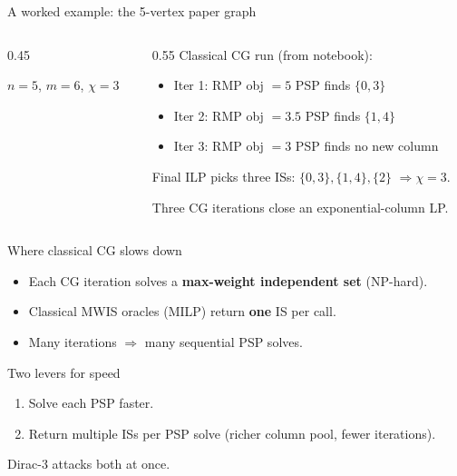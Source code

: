 \documentclass[aspectratio=169,11pt]{beamer}
\begin{document}
\begin{frame}{A worked example: the 5-vertex paper graph}
  \begin{columns}[T]
    \begin{column}{0.45\textwidth}
      \centering
      \medskip

      \footnotesize $n=5$, $m=6$, $\chi=3$
    \end{column}
    \begin{column}{0.55\textwidth}
      Classical CG run (from notebook):
      \begin{itemize}\footnotesize
        \item Iter 1: RMP obj $= 5$ \quad PSP finds $\{0,3\}$
        \item Iter 2: RMP obj $= 3.5$ \quad PSP finds $\{1,4\}$
        \item Iter 3: RMP obj $= 3$ \quad PSP finds no new column
      \end{itemize}
      \medskip

      Final ILP picks three ISs:
      $\{0,3\}, \{1,4\}, \{2\}$ \quad $\Rightarrow \chi = 3$.

      \medskip
      \footnotesize
      Three CG iterations close an exponential-column LP.
    \end{column}
  \end{columns}
\end{frame}

\begin{frame}{Where classical CG slows down}
  \begin{itemize}
    \item Each CG iteration solves a \textbf{max-weight independent set}
          (NP-hard).
    \item Classical MWIS oracles (MILP) return \textbf{one} IS per call.
    \item Many iterations $\Rightarrow$ many sequential PSP solves.
  \end{itemize}

  \medskip
  \begin{block}{Two levers for speed}
    \begin{enumerate}
      \item Solve each PSP faster.
      \item \alert{Return multiple ISs per PSP solve} (richer column pool, fewer iterations).
    \end{enumerate}
  \end{block}

  \medskip
  Dirac-3 attacks both at once.
\end{frame}
\end{document}
